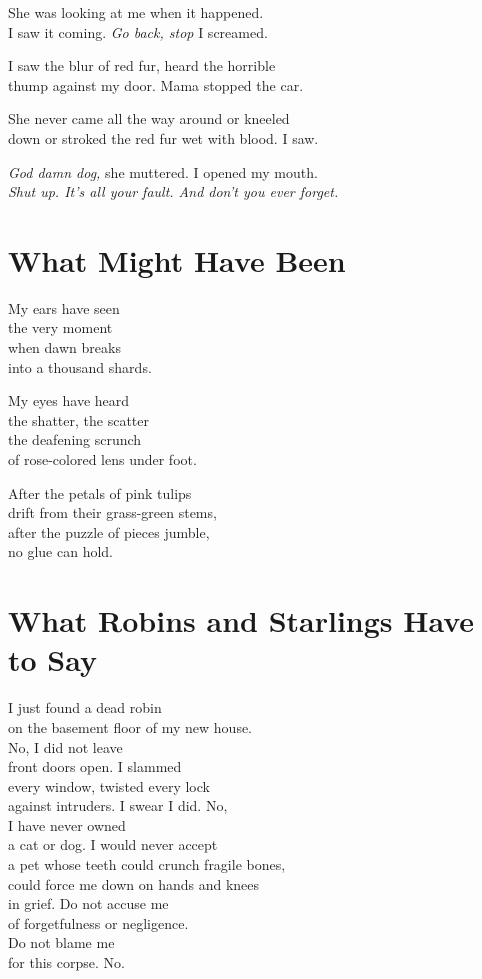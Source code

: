 \documentclass[twoside,10pt]{book}
\begin{document}
She was looking at me when it happened.\\
I saw it coming. \emph{Go back, stop} I screamed.

I saw the blur of red fur, heard the horrible\\
thump against my door. Mama stopped the car.

She never came all the way around or kneeled\\
down or stroked the red fur wet with blood. I saw.

\emph{God damn dog,} she muttered. I opened my mouth.\\
\emph{Shut up. It's all your fault. And don't you ever forget.}


\clearpage
\section{What Might Have Been}

My ears have seen\\
the very moment\\
when dawn breaks\\
into a thousand shards.

My eyes have heard\\
the shatter, the scatter\\
the deafening scrunch\\
of rose-colored lens under foot.

After the petals of pink tulips\\
drift from their grass-green stems,\\
after the puzzle of pieces jumble,\\
no glue can hold.


\clearpage
\section{What Robins and Starlings Have to Say}

I just found a dead robin\\
on the basement floor of my new house.\\
No, I did not leave\\
front doors open. I slammed\\
every window, twisted every lock\\
against intruders. I swear I did. No,\\
I have never owned\\
a cat or dog. I would never accept\\
a pet whose teeth could crunch fragile bones,\\
could force me down on hands and knees\\
in grief. Do not accuse me\\
of forgetfulness or negligence.\\
Do not blame me\\
for this corpse. No.
\end{document}
